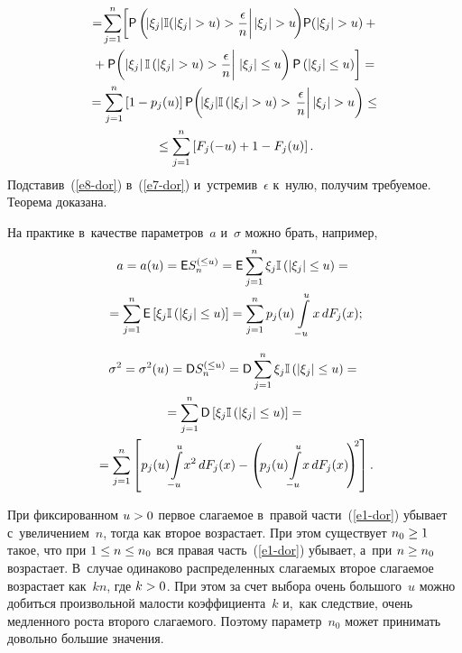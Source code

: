 \begin{multicols}{2}
\begin{multline}
{}=\!\sum\limits_{j=1}^n\!\left[ {\sf P}\left(\!|\xi_j|\mathbb{I}(|\xi_j|>u)>
{\fr{\epsilon}{n}}\!\left\vert\!
\vphantom{\fr{\epsilon}{n}} \right.
|\xi_j|>u\!\right)\!{\sf P}(|\xi_j|>u)+{}\right.
\\
\left.{}+{\sf P}\!\left(\left\vert \xi_j\right\vert
\mathbb{I}\left(\left\vert \xi_j\right\vert >u\right)>{\fr{\epsilon}{n}}\!\left\vert\!
\vphantom{\fr{\epsilon}{n}}\right.\,\left\vert \xi_j\right\vert 
\le u\right)
{\sf P}\left(\left\vert \xi_j\right\vert \le u\right)\right]={}
\\
{}=\sum\limits_{j=1}^n\left[1-p_j(u)\right]
{\sf P}\!\left(\!|\xi_j|\mathbb{I}\left(\left\vert \xi_j\right\vert>u\right)>
\left.{\fr{\epsilon}{n}}
\right\vert
\left\vert \xi_j\right\vert >u\right)\le{}\\
{}\le
\sum\limits_{j=1}^n\left[F_j(-u)+1-F_j(u)\right].
\label{e8-dor}
\end{multline}
Подставив~(\ref{e8-dor}) в~(\ref{e7-dor}) и~устремив~$\epsilon$ к~нулю, получим требуемое. Теорема доказана.

\smallskip


На практике в~качестве параметров~$a$ и~$\sigma$ можно брать, например,
\begin{multline*}
a=a(u)={\sf E}S_n^{(\le u)}={\sf E}\sum\limits_{j=1}^n \xi_j\mathbb{I}\left(\left\vert \xi_j\right\vert 
\le u\right)={}\\
{}= \sum\limits_{j=1}^n {\sf E}\left[\xi_j\mathbb{I}\left(\left\vert \xi_j\right\vert
\le u\right)\right]=\sum\limits_{j=1}^np_j(u)\int\limits_{-u}^{u}x\,dF_j(x);
\end{multline*}


\noindent
\begin{multline*}
\sigma^2=\sigma^2(u)={\sf D}S_n^{(\le u)}={\sf D}\sum\limits_{j=1}^n 
\xi_j\mathbb{I}\left(\left\vert \xi_j\right\vert \le u\right)={}\\
{}=
\sum\limits_{j=1}^n {\sf D}\left[\xi_j\mathbb{I}\left(\left\vert \xi_j\right\vert \le u\right)\right]=
{}\\
{}=\sum\limits_{j=1}^n\left[p_j(u)\!\int\limits_{-u}^{u}\!x^2\,dF_j(x)-
\left(\! p_j(u)\!\int\limits_{-u}^{u}\!x\,dF_j(x)\!
\right)^{\!\!2\,}\!\right].
\end{multline*}

При фиксированном $u\hm>0$ первое слагаемое в~правой части~(\ref{e1-dor}) 
убывает с~увеличением~$n$, тогда как второе возрастает. При этом существует $n_0\hm\ge1$ такое, что при
 $1\hm\le n\hm\le n_0$ вся правая часть~(\ref{e1-dor}) убывает, а~при $n\hm\ge n_0$ воз\-рас\-та\-ет. 
 В~случае одинаково распределенных слагаемых второе слагаемое воз\-рас\-та\-ет как~$kn$, где $k\hm>0$. 
 При этом за счет выбора очень большого~$u$ можно добиться произвольной малости коэффициента~$k$ 
 и,~как следствие, очень медленного роста второго слагаемого. Поэтому параметр~$n_0$ может 
 принимать довольно большие значения.


\end{multicols}
